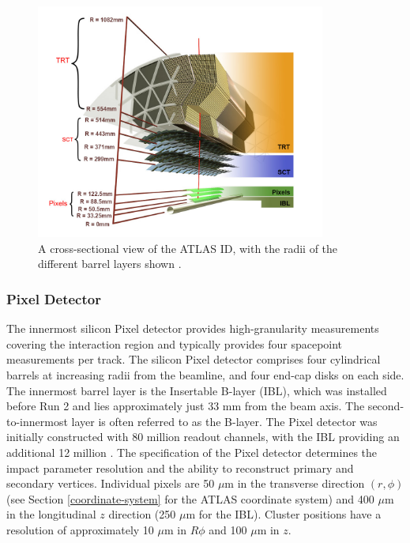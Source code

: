 \begin{figure}[!htbp]
  \centering
  \includegraphics[width=0.85\textwidth]{images/2-LHC-ATLAS/atlas_id_xs.png}
  \caption{
    A cross-sectional view of the ATLAS ID, with the radii of the different barrel layers shown \cite{atlastrackingdocs}.
  }
  \label{fig:atlas-id-run2}
\end{figure}

\subsubsection{Pixel Detector}

The innermost silicon Pixel detector \cite{pixel} provides high-granularity measurements covering the interaction region and typically provides four spacepoint measurements per track. The silicon Pixel detector comprises four cylindrical barrels at increasing radii from the beamline, and four end-cap disks on each side. The innermost barrel layer is the Insertable B-layer (IBL), which was installed before Run 2 \cite{ATLAS-TDR-19,PIX-2018-001} and lies approximately just 33 mm from the beam axis. The second-to-innermost layer is often referred to as the B-layer. The Pixel detector was initially constructed with 80 million readout channels, with the IBL providing an additional 12 million \cite{ibl}. The specification of the Pixel detector determines the impact parameter resolution and the ability to reconstruct primary and secondary vertices. Individual pixels are 50 $\mu$m in the transverse direction $(r,\phi)$ (see Section \ref{coordinate-system} for the ATLAS coordinate system) and 400 $\mu$m in the longitudinal $z$ direction (250 $\mu$m for the IBL). Cluster positions have a resolution of approximately 10 $\mu$m in $R\phi$ and 100 $\mu$m in $z$.



